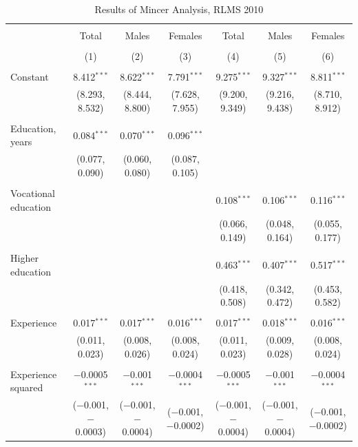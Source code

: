\documentclass[12pt,a4paper]{article}
\numberwithin{equation}{section}
\begin{document}
\begin{landscape}
	
	\fontsize{9}{11}
	\selectfont
	
	\begin{table}[!htbp] \centering 
		\caption{Results of Mincer Analysis, RLMS 2010} 
		\label{} 
		\begin{tabular}{@{\extracolsep{5pt}}lcccccc} 
			\\[-1.8ex]\hline 
			\hline \\[-1.8ex] 
			& Total & Males & Females & Total & Males & Females \\ 
			\\[-1.8ex] & (1) & (2) & (3) & (4) & (5) & (6)\\ 
			\hline \\[-1.8ex] 
			Constant & 8.412$^{***}$ & 8.622$^{***}$ & 7.791$^{***}$ & 9.275$^{***}$ & 9.327$^{***}$ & 8.811$^{***}$ \\ 
			& (8.293, 8.532) & (8.444, 8.800) & (7.628, 7.955) & (9.200, 9.349) & (9.216, 9.438) & (8.710, 8.912) \\ 
			& & & & & & \\ 
			Education, years & 0.084$^{***}$ & 0.070$^{***}$ & 0.096$^{***}$ &  &  &  \\ 
			& (0.077, 0.090) & (0.060, 0.080) & (0.087, 0.105) &  &  &  \\ 
			& & & & & & \\ 
			Vocational education &  &  &  & 0.108$^{***}$ & 0.106$^{***}$ & 0.116$^{***}$ \\ 
			&  &  &  & (0.066, 0.149) & (0.048, 0.164) & (0.055, 0.177) \\ 
			& & & & & & \\ 
			Higher education &  &  &  & 0.463$^{***}$ & 0.407$^{***}$ & 0.517$^{***}$ \\ 
			&  &  &  & (0.418, 0.508) & (0.342, 0.472) & (0.453, 0.582) \\ 
			& & & & & & \\ 
			Experience & 0.017$^{***}$ & 0.017$^{***}$ & 0.016$^{***}$ & 0.017$^{***}$ & 0.018$^{***}$ & 0.016$^{***}$ \\ 
			& (0.011, 0.023) & (0.008, 0.026) & (0.008, 0.024) & (0.011, 0.023) & (0.009, 0.028) & (0.008, 0.024) \\ 
			& & & & & & \\ 
			Experience squared & $-$0.0005$^{***}$ & $-$0.001$^{***}$ & $-$0.0004$^{***}$ & $-$0.0005$^{***}$ & $-$0.001$^{***}$ & $-$0.0004$^{***}$ \\ 
			& ($-$0.001, $-$0.0003) & ($-$0.001, $-$0.0004) & ($-$0.001, $-$0.0002) & ($-$0.001, $-$0.0004) & ($-$0.001, $-$0.0004) & ($-$0.001, $-$0.0002) \\ 

\end{tabular}
\end{table}
\end{landscape}
\end{document}
